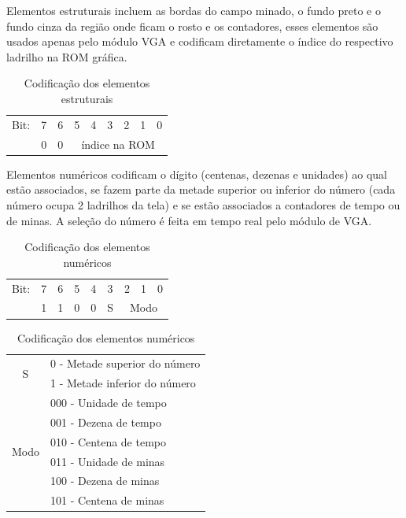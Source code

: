\documentclass[12pt]{article}
\begin{document}
Elementos estruturais incluem as bordas do campo minado, o fundo preto e
o fundo cinza da região onde ficam o rosto e os contadores, esses elementos são
usados apenas pelo módulo VGA e codificam diretamente o índice do respectivo 
ladrilho na ROM gráfica.

\begin{table}[ht!]
\centering
\begin{tabular}{l|c|c|c|c|c|c|c|c|}
\cline{2-9}
Bit: & 7 & 6 & 5 & 4 & 3 & 2 & 1 & 0 \\
\cline{2-9}
 & 0 & 0 & \multicolumn{6}{c|}{índice na ROM}\\
\cline{2-9}
\end{tabular}
\caption{Codificação dos elementos estruturais}
\label{tab:structenc}
\end{table}

Elementos numéricos codificam o dígito (centenas, dezenas e unidades) ao
qual estão associados, se fazem parte da metade superior ou inferior do
número (cada número ocupa 2 ladrilhos da tela) e se estão associados a
contadores de tempo ou de minas. A seleção do número é feita em tempo
real pelo módulo de VGA.

\begin{table}[ht!]
\centering
\begin{tabular}{l|c|c|c|c|c|c|c|c|}
\cline{2-9}
Bit: & 7 & 6 & 5 & 4 & 3 & 2 & 1 & 0 \\
\cline{2-9}
 & 1 & 1 & 0 & 0 & S & \multicolumn{3}{c|}{Modo}\\
\cline{2-9}
\end{tabular}

\vspace{5mm}

\begin{tabular}{|c|l|}
\hline
\multirow{2}{*}{S} & 0 - Metade superior do número \\
				   & 1 - Metade inferior do número \\
\hline
\multirow{6}{*}{Modo} & 000 - Unidade de tempo \\
					  & 001 - Dezena de tempo \\
					  & 010 - Centena de tempo \\
					  & 011 - Unidade de minas \\
					  & 100 - Dezena de minas \\
					  & 101 - Centena de minas \\
\hline
\end{tabular}

\caption{Codificação dos elementos numéricos}
\label{tab:numenc}
\end{table}
\end{document}
